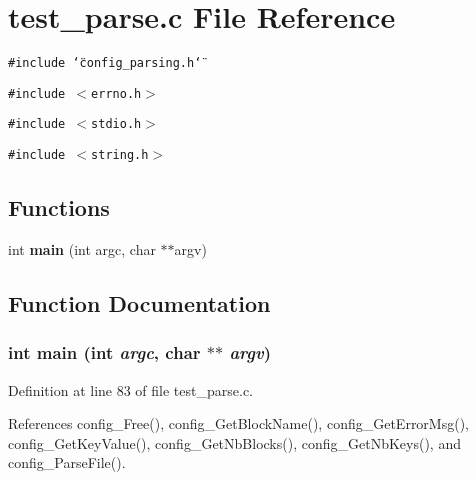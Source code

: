\section{test\_\-parse.c File Reference}
\label{test__parse_8c}
{\tt \#include \char`\"{}config\_\-parsing.h\char`\"{}}\par
{\tt \#include $<$errno.h$>$}\par
{\tt \#include $<$stdio.h$>$}\par
{\tt \#include $<$string.h$>$}\par
\subsection*{Functions}
\begin{CompactItemize}
\item 
int {\bf main} (int argc, char $\ast$$\ast$argv)
\end{CompactItemize}


\subsection{Function Documentation}
\subsubsection{\setlength{\rightskip}{0pt plus 5cm}int main (int {\em argc}, char $\ast$$\ast$ {\em argv})}\label{test__parse_8c_a0}




Definition at line 83 of file test\_\-parse.c.

References config\_\-Free(), config\_\-Get\-Block\-Name(), config\_\-Get\-Error\-Msg(), config\_\-Get\-Key\-Value(), config\_\-Get\-Nb\-Blocks(), config\_\-Get\-Nb\-Keys(), and config\_\-Parse\-File().
